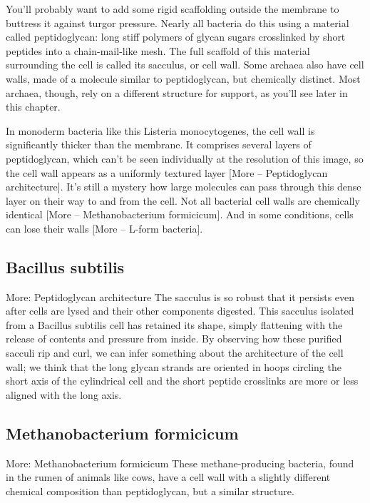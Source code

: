 \documentclass[]{book}
\begin{document}
You'll probably want to add some rigid scaffolding outside the membrane
to buttress it against turgor pressure. Nearly all bacteria do this
using a material called peptidoglycan: long stiff polymers of glycan
sugars crosslinked by short peptides into a chain-mail-like mesh. The
full scaffold of this material surrounding the cell is called its
sacculus, or cell wall. Some archaea also have cell walls, made of a
molecule similar to peptidoglycan, but chemically distinct. Most
archaea, though, rely on a different structure for support, as you'll
see later in this chapter.

In monoderm bacteria like this Listeria monocytogenes, the cell wall is
significantly thicker than the membrane. It comprises several layers of
peptidoglycan, which can't be seen individually at the resolution of
this image, so the cell wall appears as a uniformly textured layer
{[}More -- Peptidoglycan architecture{]}. It's still a mystery how large
molecules can pass through this dense layer on their way to and from the
cell. Not all bacterial cell walls are chemically identical {[}More --
Methanobacterium formicicum{]}. And in some conditions, cells can lose
their walls {[}More -- L-form bacteria{]}.

\subsection{Bacillus subtilis}\label{bacillus-subtilis}

More: Peptidoglycan architecture The sacculus is so robust that it
persists even after cells are lysed and their other components digested.
This sacculus isolated from a Bacillus subtilis cell has retained its
shape, simply flattening with the release of contents and pressure from
inside. By observing how these purified sacculi rip and curl, we can
infer something about the architecture of the cell wall; we think that
the long glycan strands are oriented in hoops circling the short axis of
the cylindrical cell and the short peptide crosslinks are more or less
aligned with the long axis.

\subsection{Methanobacterium
formicicum}\label{methanobacterium-formicicum}

More: Methanobacterium formicicum These methane-producing bacteria,
found in the rumen of animals like cows, have a cell wall with a
slightly different chemical composition than peptidoglycan, but a
similar structure.
\end{document}
